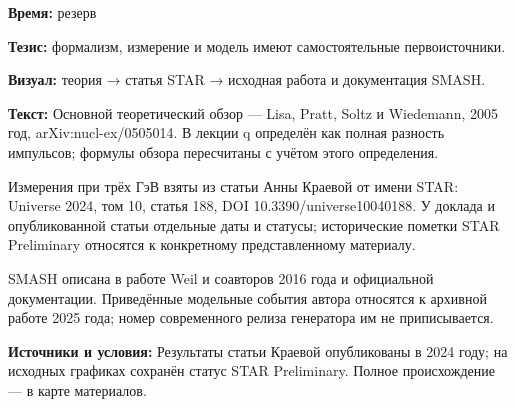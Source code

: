 \textbf{Время:} резерв

\textbf{Тезис:} формализм, измерение и модель имеют самостоятельные первоисточники.

\textbf{Визуал:} теория → статья STAR → исходная работа и документация SMASH.

\textbf{Текст:} Основной теоретический обзор — Lisa, Pratt, Soltz и Wiedemann, 2005 год, arXiv:nucl-ex/0505014. В лекции q определён как полная разность импульсов; формулы обзора пересчитаны с учётом этого определения.

Измерения при трёх ГэВ взяты из статьи Анны Краевой от имени STAR: Universe 2024, том 10, статья 188, DOI 10.3390/universe10040188. У доклада и опубликованной статьи отдельные даты и статусы; исторические пометки STAR Preliminary относятся к конкретному представленному материалу.

SMASH описана в работе Weil и соавторов 2016 года и официальной документации. Приведённые модельные события автора относятся к архивной работе 2025 года; номер современного релиза генератора им не приписывается.

\textbf{Источники и условия:} Результаты статьи Краевой опубликованы в 2024 году; на исходных графиках сохранён статус STAR Preliminary. Полное происхождение — в карте материалов.
